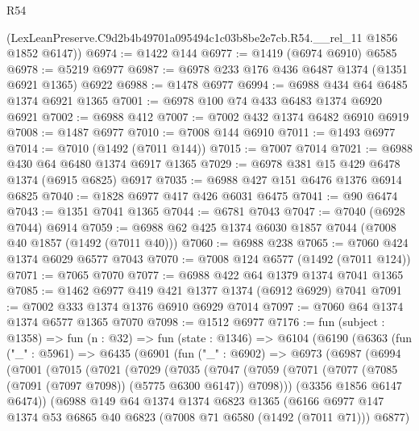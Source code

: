 \begin{lexlean}{R54}
\begin{coremodule}
      (LexLeanPreserve.C9d2b4b49701a095494c1c03b8be2e7cb.R54.__rel_11 @1856 @1852 @6147))
@6974 := @1422 @144
@6977 := @1419 (@6974 @6910) @6585
@6978 := @5219 @6977
@6987 := @6978 @233 @176 @436 @6487 @1374 (@1351 @6921 @1365) @6922
@6988 := @1478 @6977
@6994 := @6988 @434 @64 @6485 @1374 @6921 @1365
@7001 := @6978 @100 @74 @433 @6483 @1374 @6920 @6921
@7002 := @6988 @412
@7007 := @7002 @432 @1374 @6482 @6910 @6919
@7008 := @1487 @6977
@7010 := @7008 @144 @6910
@7011 := @1493 @6977
@7014 := @7010 (@1492 (@7011 @144))
@7015 := @7007 @7014
@7021 := @6988 @430 @64 @6480 @1374 @6917 @1365
@7029 := @6978 @381 @15 @429 @6478 @1374 (@6915 @6825) @6917
@7035 := @6988 @427 @151 @6476 @1376 @6914 @6825
@7040 := @1828 @6977 @417 @426 @6031 @6475
@7041 := @90 @6474
@7043 := @1351 @7041 @1365
@7044 := @6781 @7043
@7047 := @7040 (@6928 @7044) @6914
@7059 := @6988 @62 @425 @1374 @6030 @1857 @7044 (@7008 @40 @1857 (@1492 (@7011 @40)))
@7060 := @6988 @238
@7065 := @7060 @424 @1374 @6029 @6577 @7043
@7070 := @7008 @124 @6577 (@1492 (@7011 @124))
@7071 := @7065 @7070
@7077 := @6988 @422 @64 @1379 @1374 @7041 @1365
@7085 := @1462 @6977 @419 @421 @1377 @1374 (@6912 @6929) @7041
@7091 := @7002 @333 @1374 @1376 @6910 @6929 @7014
@7097 := @7060 @64 @1374 @1374 @6577 @1365 @7070
@7098 := @1512 @6977
@7176 := fun (subject : @1358) =>
  fun (n : @32) =>
  fun (state : @1346) =>
  @6104
    (@6190
      (@6363
        (fun ("_" : @5961) =>
        @6435
          (@6901
            (fun ("_" : @6902) =>
            @6973
              (@6987
                (@6994
                  (@7001
                    (@7015
                      (@7021
                        (@7029
                          (@7035
                            (@7047
                              (@7059
                                (@7071
                                  (@7077 (@7085 (@7091 (@7097 @7098)) (@5775 @6300 @6147)) @7098)))
                              (@3356 @1856 @6147 @6474))
                            (@6988
                              @149
                              @64
                              @1374
                              @1374
                              @6823
                              @1365
                              (@6166
                                @6977
                                @147
                                @1374
                                @53
                                @6865
                                @40
                                @6823
                                (@7008 @71 @6580 (@1492 (@7011 @71)))
                                @6877)

\end{coremodule}
\end{lexlean}
